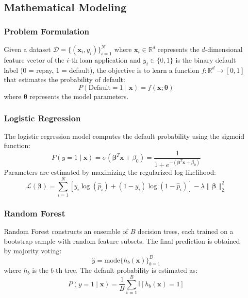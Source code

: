 \documentclass[preprint,12pt,authoryear]{elsarticle}
\begin{document}
\subsection{Mathematical Modeling}

\subsubsection{Problem Formulation}
Given a dataset $\mathcal{D} = \{(\mathbf{x}_i, y_i)\}_{i=1}^{N}$ where $\mathbf{x}_i \in \mathbb{R}^d$ represents the $d$-dimensional feature vector of the $i$-th loan application and $y_i \in \{0, 1\}$ is the binary default label (0 = repay, 1 = default), the objective is to learn a function $f: \mathbb{R}^d \rightarrow [0, 1]$ that estimates the probability of default:
\begin{equation}
    P(\text{Default} = 1 \mid \mathbf{x}) = f(\mathbf{x}; \boldsymbol{\theta})
\end{equation}
where $\boldsymbol{\theta}$ represents the model parameters.

\subsubsection{Logistic Regression}
The logistic regression model computes the default probability using the sigmoid function:
\begin{equation}
    P(y = 1 \mid \mathbf{x}) = \sigma(\boldsymbol{\beta}^T \mathbf{x} + \beta_0) = \frac{1}{1 + e^{-(\boldsymbol{\beta}^T \mathbf{x} + \beta_0)}}
\end{equation}
Parameters are estimated by maximizing the regularized log-likelihood:
\begin{equation}
    \mathcal{L}(\boldsymbol{\beta}) = \sum_{i=1}^{N} \left[ y_i \log(\hat{p}_i) + (1 - y_i) \log(1 - \hat{p}_i) \right] - \lambda \|\boldsymbol{\beta}\|_2^2
\end{equation}

\subsubsection{Random Forest}
Random Forest constructs an ensemble of $B$ decision trees, each trained on a bootstrap sample with random feature subsets. The final prediction is obtained by majority voting:
\begin{equation}
    \hat{y} = \text{mode}\{h_b(\mathbf{x})\}_{b=1}^{B}
\end{equation}
where $h_b$ is the $b$-th tree. The default probability is estimated as:
\begin{equation}
    P(y = 1 \mid \mathbf{x}) = \frac{1}{B} \sum_{b=1}^{B} \mathbb{I}[h_b(\mathbf{x}) = 1]
\end{equation}
\end{document}
